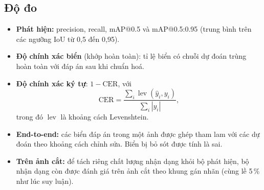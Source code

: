 \subsection{Độ đo}
\begin{itemize}[nosep]
  \item \textbf{Phát hiện:} precision, recall, mAP@0.5 và mAP@0.5:0.95 (trung bình trên các ngưỡng IoU từ 0,5 đến 0,95).
  \item \textbf{Độ chính xác biển} (khớp hoàn toàn): tỉ lệ biển có chuỗi dự đoán trùng hoàn toàn với đáp án sau khi chuẩn hoá.
  \item \textbf{Độ chính xác ký tự}: $1 - \text{CER}$, với
  \begin{equation}
    \text{CER} = \frac{\sum_i \operatorname{lev}(\hat{y}_i, y_i)}{\sum_i |y_i|},
  \end{equation}
  trong đó $\operatorname{lev}$ là khoảng cách Levenshtein.
  \item \textbf{End-to-end:} các biển đáp án trong một ảnh được ghép tham lam với các dự đoán theo khoảng cách chỉnh sửa. Biển bị bỏ sót được tính là sai.
  \item \textbf{Trên ảnh cắt:} để tách riêng chất lượng nhận dạng khỏi bộ phát hiện, bộ nhận dạng còn được đánh giá trên ảnh cắt theo khung gán nhãn (cùng lề 5\,\% như lúc suy luận).
\end{itemize}

